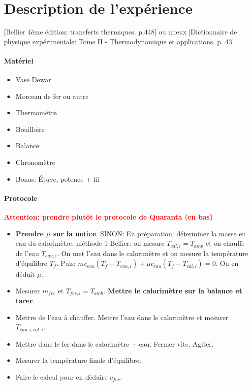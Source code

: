 \documentclass[11pt]{report}
\numberwithin{figure}{section}
\numberwithin{equation}{section}
\numberwithin{table}{section}
\newcommand{\1}{\boldsymbol{1}}
\begin{document}
\section*{Description de l'expérience}

[Bellier 4ème édition: transferts thermiques. p.448] ou mieux [Dictionnaire de physique expérimentale: Tome II - Thermodynamique et applications. p. 43]

\begin{tcolorbox}[breakable, enhanced, colback=red!2!white,colframe=mycolor!85!black,title=\textbf{\textbf{Expérience}}]
\paragraph*{Matériel}
\begin{itemize}
\item Vase Dewar
\item Morceau de fer ou autre
\item Thermomètre
\item Bouilloire
\item Balance
\item Chronomètre
\item Bonus: Étuve, potence + fil
\end{itemize}

\paragraph*{Protocole} \textbf{\textcolor{red}{Attention: prendre plutôt le protocole de Quaranta (en bas)}} 

\begin{itemize}[label=$\triangleright$]
		\item \textbf{Prendre $\mu$ sur la notice}. SINON: En préparation: déterminer la masse en eau du calorimètre: méthode 1 Bellier: on mesure $T_{cal,i} = T_{amb}$ et on chauffe de l'eau $T_{eau,i}$. On met l'eau dans le calorimètre et on mesure la température d'équilibre $T_f$. Puis: $m c_{eau} (T_f - T_{eau,i}) + \mu c_{eau} (T_f - T_{cal,i}) = 0$. On en déduit $\mu$. 
		\item Mesurer $m_{fer}$ et $T_{fer,i} = T_{amb}$. \textbf{Mettre le calorimètre sur la balance et tarer}.
		\item Mettre de l'eau à chauffer. Mettre l'eau dans le calorimètre et mesurer $T_{eau+cal,i}$. 
		\item  Mettre dans le fer dans le calorimètre + eau. Fermer vite. Agiter.
\item Mesurer la température finale d'équilibre.
\item Faire le calcul pour en déduire $c_{fer}$.
\end{itemize}


\end{tcolorbox}
\end{document}

